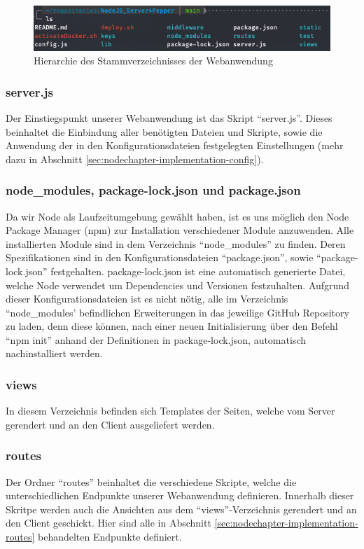 \begin{figure}[H]
    \includegraphics[width=\textwidth]{Figures/NodeChapter/ServerFileStructure.png}
    \caption{Hierarchie des Stammverzeichnisses der Webanwendung}
    \label{fig:webhierarchie}
    \centering
\end{figure}

\subsubsection*{server.js}
Der Einstiegspunkt unserer Webanwendung ist das Skript ``server.js''. Dieses beinhaltet die Einbindung aller
benötigten Dateien und Skripte, sowie die Anwendung der in den Konfigurationsdateien festgelegten Einstellungen
(mehr dazu in Abschnitt \ref{sec:nodechapter-implementation-config}).

\subsubsection*{node\_modules, package-lock.json und package.json}
Da wir Node als Laufzeitumgebung gewählt haben, ist es uns möglich den Node Package Manager (npm) zur Installation
verschiedener Module anzuwenden. Alle installierten Module sind in dem Verzeichnis ``node\_modules'' zu finden.
Deren Spezifikationen sind in den Konfigurationsdateien ``package.json'', sowie ``package-lock.json'' festgehalten.
package-lock.json ist eine automatisch generierte Datei, welche Node verwendet um Dependencies und Versionen festzuhalten.
Aufgrund dieser Konfigurationsdateien ist es nicht nötig, alle im Verzeichnis ``node\_modules' befindlichen Erweiterungen
in das jeweilige GitHub Repository zu laden, denn diese können, nach einer neuen Initialisierung über den Befehl ``npm init''
anhand der Definitionen in package-lock.json, automatisch nachinstalliert werden.

\subsubsection*{views}
In diesem Verzeichnis befinden sich Templates der Seiten, welche vom Server gerendert und an den Client ausgeliefert werden.

\subsubsection*{routes}
Der Ordner ``routes'' beinhaltet die verschiedene Skripte, welche die unterschiedlichen Endpunkte unserer Webanwendung definieren.
Innerhalb dieser Skritpe werden auch die Ansichten aus dem ``views''-Verzeichnis gerendert und an den Client geschickt. Hier sind alle
in Abschnitt \ref{sec:nodechapter-implementation-routes} behandelten Endpunkte definiert.


